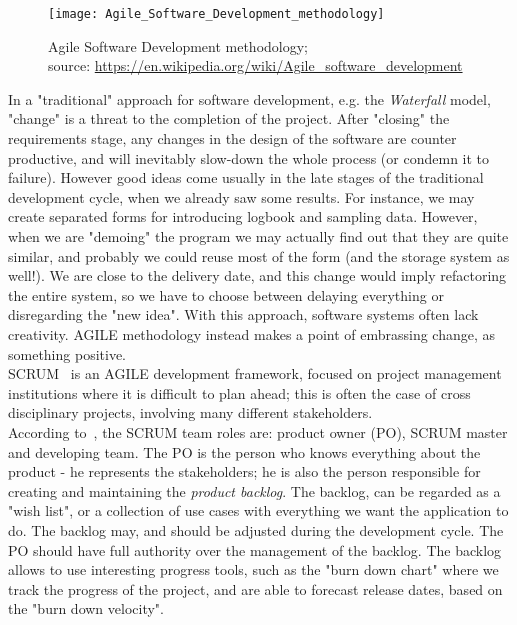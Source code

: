 \documentclass[11pt]{article} %
\begin{document}
  \begin{figure}[!ht]%
    \begin{center} 
	\texttt{[image: Agile\_Software\_Development\_methodology]}
      \caption[Agile Software Development methodology;]
{Agile Software Development methodology;\\ source: \url{https://en.wikipedia.org/wiki/Agile_software_development}}
      \label{agile-pic} %
    \end{center} 
  \end{figure}

In a "traditional" approach for software development, e.g. the \emph{Waterfall} model, "change" is a threat to the completion of the project. After "closing" the requirements stage, any changes in the design of the software are counter productive, and will inevitably slow-down the whole process (or condemn it to failure). However good ideas come usually in the late stages of the traditional development cycle, when we already saw some results. For instance, we may create separated forms for introducing logbook and sampling data. However, when we are "demoing" the program we may actually find out that they are quite similar, and probably we could reuse most of the form (and the storage system as well!). We are close to the delivery date, and this change would imply refactoring the entire system, so we have to choose between delaying everything or disregarding the "new idea". With this approach, software systems often lack creativity. AGILE methodology instead makes a point of embrassing change, as something 
positive.\\
SCRUM~\cite{scrum} is an AGILE development framework, focused on project management institutions where it is difficult to plan ahead; this is often the case of cross disciplinary projects, involving many different stakeholders.\\
According to~\cite{scrum_guide}, the SCRUM team roles are: product owner (PO), SCRUM master and developing team. The PO is the person who knows everything about the product - he represents the stakeholders; he is also the person responsible for creating and maintaining the \emph{product backlog}. The backlog, can be regarded as a "wish list", or a collection of use cases with everything we want the application to do. The backlog may, and should be adjusted during the development cycle. The PO should have full authority over the management of the backlog. The backlog allows to use interesting progress tools, such as the "burn down chart" where we track the progress of the project, and are able to forecast release dates, based on the "burn down velocity".\\
\end{document}
